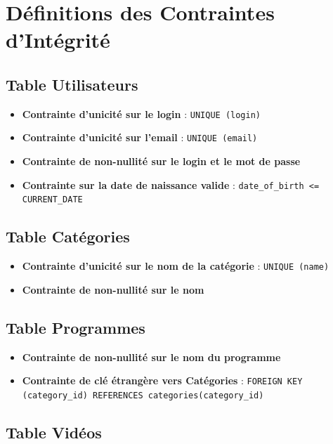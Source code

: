 \documentclass{article}
\begin{document}
\section{Définitions des Contraintes d'Intégrité}

\subsection{Table Utilisateurs}

\begin{itemize}
    \item \textbf{Contrainte d'unicité sur le login} : \texttt{UNIQUE (login)}
    \item \textbf{Contrainte d'unicité sur l'email} : \texttt{UNIQUE (email)}
    \item \textbf{Contrainte de non-nullité sur le login et le mot de passe}
    \item \textbf{Contrainte sur la date de naissance valide} : \texttt{date\_of\_birth <= CURRENT\_DATE}
\end{itemize}

\subsection{Table Catégories}

\begin{itemize}
    \item \textbf{Contrainte d'unicité sur le nom de la catégorie} : \texttt{UNIQUE (name)}
    \item \textbf{Contrainte de non-nullité sur le nom}
\end{itemize}

\subsection{Table Programmes}

\begin{itemize}
    \item \textbf{Contrainte de non-nullité sur le nom du programme}
    \item \textbf{Contrainte de clé étrangère vers Catégories} : \texttt{FOREIGN KEY (category\_id) REFERENCES categories(category\_id)}
\end{itemize}

\subsection{Table Vidéos}
\end{document}
